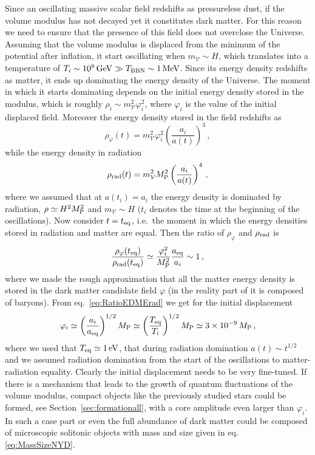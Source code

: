 \documentclass[11pt,a4paper]{article}
\newcommand{\V}{\mathcal{V}}
\begin{document}
Since an oscillating massive scalar field redshifts as pressureless dust, if the volume modulus has not decayed yet it constitutes dark matter. For this reason we need to ensure that the presence of this field does not overclose the Universe. Assuming that the volume modulus is displaced from the minimum of the potential after inflation, it start oscillating when $m_{\V} \sim H$, which translates into a temperature of $T_i \sim 10^8 \, \text{GeV} \gg T_{\rm BBN} \sim 1 \, \text{MeV}$. Since its energy density redshifts as matter, it ends up dominating the energy density of the Universe. The moment in which it starts dominating depends on the initial energy density stored in the modulus, which is roughly $\rho_i \sim m_{\V}^2 \varphi_i^2$, where $\varphi_i$ is the value of the initial displaced field. Moreover the energy density stored in the field redshifts as
\begin{equation}
\rho_\varphi(t) = m_{\V}^2 \varphi_i^2 \left(\frac{a_i}{a(t)}\right)^3 \,,
\end{equation}
while the energy density in radiation
\begin{equation}
\rho_{\rm rad}(t) = m_{\V}^2 M_{\rm P}^2 \left(\frac{a_i}{a(t)}\right)^4 \,,
\end{equation}
where we assumed that at $a(t_i) = a_i$ the energy density is dominated by radiation, $\rho \simeq H^2 M_{\rm P}^2$ and $m_{\V} \sim H$ ($t_i$ denotes the time at the beginning of the oscillations). Now consider $t = t_{\rm eq}$, i.e.~the moment in which the energy densities stored in radiation and matter are equal. Then the ratio of $\rho_{\varphi}$ and $\rho_{\rm rad}$ is
\begin{equation}
\label{eq:RatioEDMErad}
\frac{\rho_{\varphi}(t_{\rm eq})}{\rho_{\rm rad}(t_{\rm eq})} \simeq \frac{\varphi_i^2}{M_{\rm P}^2} \frac{a_{\rm eq}}{a_i} \sim 1\,,
\end{equation}
where we made the rough approximation that all the matter energy density is stored in the dark matter candidate field $\varphi$ (in the reality part of it is composed of baryons). From eq.~\eqref{eq:RatioEDMErad} we get for the initial displacement
\begin{equation}
\varphi_i \simeq \left(\frac{a_i}{a_{\rm eq}}\right)^{1/2} M_{\rm P} \simeq \left(\frac{T_{\rm eq}}{T_i}\right)^{1/2} M_{\rm P} \simeq 3 \times 10^{-9} \, M_{\rm P} \,,
\end{equation}
where we used that $T_{\rm eq} \simeq 1 \, \text{eV}$, that during radiation domination $a(t) \sim t^{1/2}$ and we assumed radiation domination from the start of the oscillations to matter-radiation equality. Clearly the initial displacement needs to be very fine-tuned. If there is a mechanism that leads to the growth of quantum fluctuations of the volume modulus, compact objects like the previously studied stars could be formed, see Section~\ref{sec:formationall}, with a core amplitude even larger than $\varphi_i$. In such a case part or even the full abundance of dark matter could be composed of microscopic solitonic objects with mass and size given in eq. \eqref{eq:MassSizeNYD}.
\end{document}
